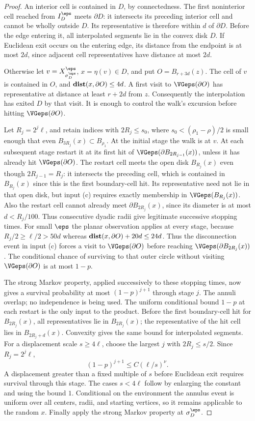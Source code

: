 \begin{proof}
An interior cell is contained in $D$, by connectedness.
The first noninterior cell reached from $I_D^\eps$ meets
$\partial D$: it intersects its preceding interior cell and
cannot be wholly outside $D$. Its representative is therefore
within $d$ of $\partial D$.
Before the edge entering it, all interpolated segments lie in
the convex disk $D$. If Euclidean exit occurs on the entering
edge, its distance from the endpoint is at most $2d$, since
adjacent cell representatives have distance at most $2d$.

Otherwise let $v=X^\eps_{\sigma_D^\eps}$,
$x=\eta(v)\in D$, and put $O=B_{r+3d}(z)$.
The cell of $v$ is contained in $O$, and
$\mathop{\bf dist{}}(x,\partial O)\le4d$.
A first visit to $\VGeps(\partial O)$ has representative at
distance at least $r+2d$ from $z$.
Consequently the interpolation has exited $D$ by that visit.
It is enough to control the walk's excursion before hitting
$\VGeps(\partial O)$.

Let $R_j=2^j\ell$, and retain indices with $2R_j\le s_0$,
where $s_0<(\rho_1-\rho)/2$ is small enough that even
$B_{3R_j}(x)\subset B_{\rho_1}$. At the initial stage
the walk is at $v$.
At each subsequent stage restart it at its first hit of
$\VGeps(\partial B_{2R_{j-1}}(x))$, unless it has already hit
$\VGeps(\partial O)$. The restart cell meets the open disk
$B_{R_j}(x)$ even though $2R_{j-1}=R_j$:
it intersects the preceding cell, which is contained
in $B_{R_j}(x)$ since this is the first boundary-cell hit.
Its representative need not lie in that open disk, but
input (c) requires exactly membership in $\VGeps(B_{R_j}(x))$.
Also the restart cell cannot already meet
$\partial B_{2R_j}(x)$, since its diameter is at most
$d<R_j/100$. Thus consecutive dyadic radii give legitimate
successive stopping times.
For small $\eps$ the planar observation applies at every
stage, because $R_j/2\ge\ell/2>50d$ whereas
$\mathop{\bf dist{}}(x,\partial O)+20d\le24d$.
Thus the disconnection event in input (c) forces a visit
to $\VGeps(\partial O)$ before reaching
$\VGeps(\partial B_{2R_j}(x))$.
The conditional chance of surviving to that outer circle
without visiting $\VGeps(\partial O)$ is at most $1-p$.

The strong Markov property, applied successively to these
stopping times, now gives a survival probability at most
$(1-p)^{j+1}$ through stage $j$. The annuli overlap; no
independence is being used. The uniform conditional bound
$1-p$ at each restart is the only input to the product.
Before the first boundary-cell hit for $B_{2R_j}(x)$,
all representatives lie in $B_{2R_j}(x)$; the representative
of the hit cell lies in $B_{2R_j+d}(x)$. Convexity gives the
same bound for interpolated segments.
For a displacement scale $s\ge4\ell$, choose the largest $j$
with $2R_j\le s/2$. Since $R_j=2^j\ell$,
\[
 (1-p)^{j+1}\le C(\ell/s)^\nu.
\]
A displacement greater than a fixed multiple of $s$ before
Euclidean exit requires survival through this stage.
The cases $s<4\ell$ follow by enlarging the constant and using
the bound $1$. Conditional on the environment the annulus
event is uniform over all centers, radii, and starting
vertices, so it remains applicable to the random $x$.
Finally apply the strong Markov property at $\sigma_D^\eps$.
\end{proof}

